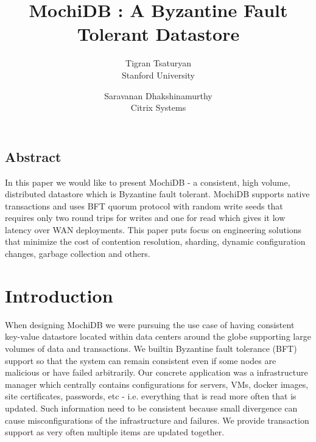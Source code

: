 \documentclass[letterpaper,twocolumn,10pt]{article}
\begin{document}
\date{}

\title{\Large \bf MochiDB : A Byzantine Fault Tolerant Datastore}
\author{
{\rm Tigran Tsaturyan}\\
Stanford University
\and
{\rm Saravanan Dhakshinamurthy}\\
Citrix Systems
}

\maketitle

\thispagestyle{empty}


\subsection*{Abstract}
In this paper we would like to present MochiDB - a consistent, high volume, distributed datastore which is Byzantine fault tolerant. MochiDB supports native transactions and uses BFT quorum protocol with random write seeds that requires only two round trips for writes and one for read which gives it low latency over WAN deployments. This paper puts focus on engineering solutions that minimize the cost of contention resolution, sharding, dynamic configuration changes, garbage collection and others. 

\section{Introduction}

When designing MochiDB we were pursuing the use case of having consistent key-value datastore located within data centers around the globe supporting large volumes of data and transactions. We builtin Byzantine fault tolerance (BFT) support so that the system can remain consistent even if some nodes are malicious or have failed arbitrarily. Our concrete application was a infrastructure manager which centrally contains configurations for servers, VMs, docker images, site certificates, passwords, etc - i.e. everything that is read more often that is updated. Such information need to be consistent because small divergence can cause misconfigurations of the infrastructure and failures. We provide transaction support as very often multiple items are updated together. 
\end{document}
